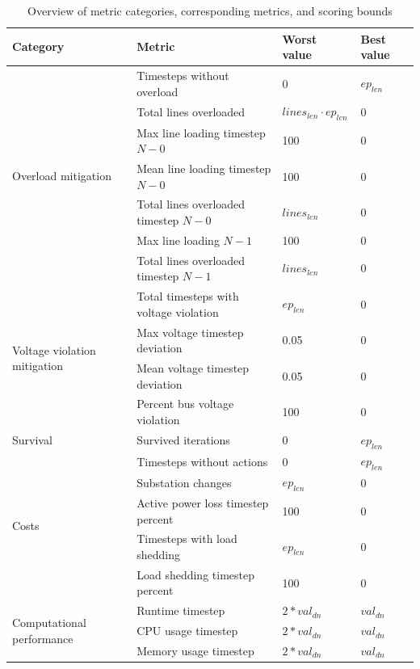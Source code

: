 \begin{table}[htbp]
\centering
\footnotesize
\caption{Overview of metric categories, corresponding metrics, and scoring bounds}
\label{tab:metric_categories}
\begin{tabular}{ | p{} | p{} | p{} | p{} |}
\hline
\textbf{Category} & \textbf{Metric} & \textbf{Worst value} & \textbf{Best value} \\
\hline

\multirow{7}{=}{Overload mitigation}
& Timesteps without overload & 0 & $ep_{len}$ \\
& Total lines overloaded & $lines_{len} \cdot ep_{len}$  & 0 \\
& Max line loading timestep $N-0$ & 100 & 0 \\
& Mean line loading timestep $N-0$ & 100 & 0 \\
& Total lines overloaded timestep $N-0$ & $lines_{len}$ & 0 \\
& Max line loading $N-1$ & 100 & 0 \\
& Total lines overloaded timestep $N-1$ & $lines_{len}$ & 0 \\
\hline

\multirow{4}{=}{Voltage violation mitigation}
& Total timesteps with voltage violation & $ep_{len}$  & 0 \\
& Max voltage timestep deviation & 0.05 & 0 \\
& Mean voltage timestep deviation & 0.05 & 0 \\
& Percent bus voltage violation & 100 & 0 \\
\hline

\multirow{1}{=}{Survival}
& Survived iterations & 0 & $ep_{len}$ \\
\hline

\multirow{5}{=}{Costs}
& Timesteps without actions & 0 & $ep_{len}$ \\
& Substation changes & $ep_{len}$ & 0 \\
& Active power loss timestep percent & 100 & 0 \\
& Timesteps with load shedding & $ep_{len}$ & 0 \\
& Load shedding timestep percent & 100 & 0 \\
\hline

\multirow{3}{=}{Computational performance}
& Runtime timestep & $2 * val_{dn}$ & $val_{dn}$ \\
& CPU usage timestep & $2* val_{dn}$ & $val_{dn}$ \\
& Memory usage timestep & $2* val_{dn}$ & $val_{dn}$ \\
\hline

\end{tabular}
\end{table}

